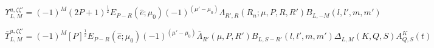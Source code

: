 

\begin{equation}
\varUpsilon_{L,M}^{u,\zeta\zeta'}=(-1)^{M}(2P+1)^{\frac{1}{2}}E_{P-R}(\hat{e};\mu_{0})(-1)^{(\mu'-\mu_{0})}\Lambda_{R',R}(R_{\hat{n}};\mu,P,R,R')B_{L,-M}(l,l',m,m')
\label{eq:channel-func-defn-MF}
\end{equation}

\begin{equation}
\bar{\varUpsilon}_{L,M}^{u,\zeta\zeta'}=(-1)^{M}[P]^{\frac{1}{2}}E_{P-R}(\hat{e};\mu_{0})(-1)^{(\mu'-\mu_{0})}\bar{\Lambda}_{R'}(\mu,P,R')B_{L,S-R'}(l,l',m,m')\Delta_{L,M}(K,Q,S)A_{Q,S}^{K}(t)
\label{eq:channel-func-defn-AF}
\end{equation}


